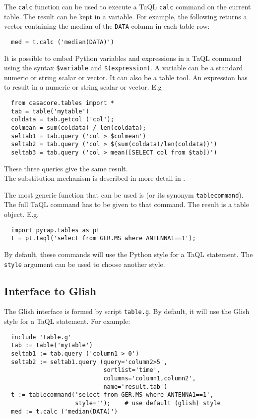   The \texttt{calc} function can be used to execute a TaQL
  \texttt{calc} command on the current table. The result can be kept
  in a variable. For example, the following returns a vector containing
  the median of the \texttt{DATA} column in each table row:
\begin{verbatim}
  med = t.calc ('median(DATA)')
\end{verbatim}

  It is possible to embed Python variables and expressions in a TaQL
  command using the syntax \texttt{\$variable} and
  \texttt{\$(expression)}. A variable can be a standard numeric or
  string scalar or vector. It can also be a table tool.
  An expression has to result in a numeric or string scalar or vector.
  E.g
\begin{verbatim}
  from casacore.tables import *
  tab = table('mytable')
  coldata = tab.getcol ('col');
  colmean = sum(coldata) / len(coldata);
  seltab1 = tab.query ('col > $colmean')
  seltab2 = tab.query ('col > $(sum(coldata)/len(coldata))')
  seltab3 = tab.query ('col > mean([SELECT col from $tab])')
\end{verbatim}
  These three queries give the same result.
  \\The substitution mechanism is described in more detail in
  .

  The most generic function that can be used is
  (or its synonym \texttt{tablecommand}).
  The full TaQL command has to be given to that command. The result is
  a table object. E.g.
\begin{verbatim}
  import pyrap.tables as pt
  t = pt.taql('select from GER.MS where ANTENNA1==1');
\end{verbatim}  

  By default, these commands will use the Python style for a TaQL
  statement. The \texttt{style} argument can be used
  to choose another style.

\subsection{Interface to Glish}
  The Glish interface is formed by script \texttt{table.g}.
  By default, it will use the Glish style for a TaQL
  statement.
  For example:
\begin{verbatim}
  include 'table.g'
  tab := table('mytable')
  seltab1 := tab.query ('column1 > 0')
  seltab2 := seltab1.query (query='column2>5',
                            sortlist='time',
                            columns='column1,column2',
                            name='result.tab')
  t := tablecommand('select from GER.MS where ANTENNA1==1',
                    style='');    # use default (glish) style
  med := t.calc ('median(DATA)')
\end{verbatim}

